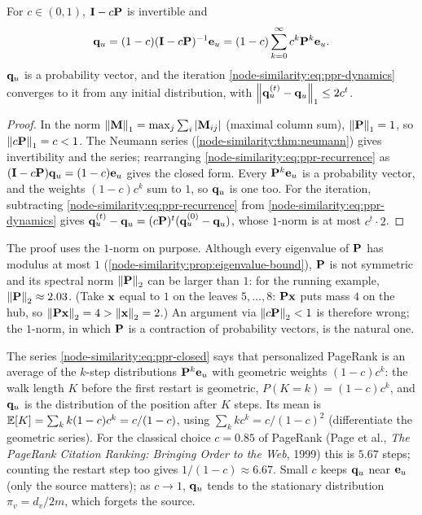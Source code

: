 \begin{notechapter}
\begin{proposition}\label{node-similarity:prop:ppr-closed}
For $c\in(0,1)$, $\mathbf{I} - c\mathbf{P}$ is invertible and
\begin{equation}
\mathbf{q}_u = (1-c)(\mathbf{I} - c\mathbf{P})^{-1}\mathbf{e}_u = (1-c)\sum_{k=0}^\infty c^k\mathbf{P}^k\mathbf{e}_u .
\label{node-similarity:eq:ppr-closed}
\end{equation}
$\mathbf{q}_u$ is a probability vector, and the iteration \eqref{node-similarity:eq:ppr-dynamics} converges to it from any initial distribution, with $\left\|\mathbf{q}_u^{(t)} - \mathbf{q}_u\right\|_1 \le 2c^t$.
\end{proposition}

\begin{proof}
In the norm $\left\|\mathbf{M}\right\|_1 = \max_j\sum_i\left|\mathbf{M}_{ij}\right|$ (maximal column sum), $\left\|\mathbf{P}\right\|_1 = 1$, so $\left\|c\mathbf{P}\right\|_1 = c < 1$. The Neumann series (\cref{node-similarity:thm:neumann}) gives invertibility and the series; rearranging \eqref{node-similarity:eq:ppr-recurrence} as $(\mathbf{I} - c\mathbf{P})\mathbf{q}_u = (1-c)\mathbf{e}_u$ gives the closed form. Every $\mathbf{P}^k\mathbf{e}_u$ is a probability vector, and the weights $(1-c)c^k$ sum to $1$, so $\mathbf{q}_u$ is one too. For the iteration, subtracting \eqref{node-similarity:eq:ppr-recurrence} from \eqref{node-similarity:eq:ppr-dynamics} gives $\mathbf{q}_u^{(t)} - \mathbf{q}_u = (c\mathbf{P})^t(\mathbf{q}_u^{(0)} - \mathbf{q}_u)$, whose $1$-norm is at most $c^t\cdot2$.
\end{proof}

\begin{pitfall}
The proof uses the $1$-norm on purpose. Although every eigenvalue of $\mathbf{P}$ has modulus at most $1$ (\cref{node-similarity:prop:eigenvalue-bound}), $\mathbf{P}$ is not symmetric and its spectral norm $\left\|\mathbf{P}\right\|_2$ can be larger than $1$: for the running example, $\left\|\mathbf{P}\right\|_2 \approx 2.03$. (Take $\mathbf{x}$ equal to $1$ on the leaves $5, \ldots, 8$: $\mathbf{P}\mathbf{x}$ puts mass $4$ on the hub, so $\left\|\mathbf{P}\mathbf{x}\right\|_2 = 4 > \left\|\mathbf{x}\right\|_2 = 2$.) An argument via $\left\|c\mathbf{P}\right\|_2 < 1$ is therefore wrong; the $1$-norm, in which $\mathbf{P}$ is a contraction of probability vectors, is the natural one.
\end{pitfall}

The series \eqref{node-similarity:eq:ppr-closed} says that personalized PageRank is an average of the $k$-step distributions $\mathbf{P}^k\mathbf{e}_u$ with geometric weights $(1-c)c^k$: the walk length $K$ before the first restart is geometric, $P(K = k) = (1-c)c^k$, and $\mathbf{q}_u$ is the distribution of the position after $K$ steps. Its mean is $\mathbb{E}[K] = \sum_k k(1-c)c^k = c/(1-c)$, using $\sum_k kc^k = c/(1-c)^2$ (differentiate the geometric series). For the classical choice $c = 0.85$ of PageRank (Page et al., \emph{The PageRank Citation Ranking: Bringing Order to the Web}, 1999) this is $5.67$ steps; counting the restart step too gives $1/(1-c) \approx 6.67$. Small $c$ keeps $\mathbf{q}_u$ near $\mathbf{e}_u$ (only the source matters); as $c \to 1$, $\mathbf{q}_u$ tends to the stationary distribution $\pi_v = d_v/2m$, which forgets the source.


\end{notechapter}
